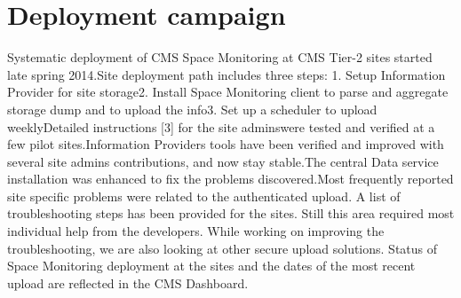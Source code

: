 \section {Deployment campaign}

Systematic deployment of CMS Space Monitoring at CMS Tier-2 sites started late spring 2014.Site deployment path includes three steps: 1. Setup Information Provider for site storage2. Install Space Monitoring client to parse and aggregate storage dump and to upload the info3. Set up a scheduler to upload weeklyDetailed instructions [3] for the site adminswere tested and verified at a few pilot sites.Information Providers tools have been verified and improved with several site admins contributions, and now stay stable.The central Data service installation was enhanced to fix the problems discovered.Most frequently reported site specific problems were related to the authenticated upload. A list of troubleshooting steps has been provided for the sites. Still this area required most individual help from the developers. While working on improving the troubleshooting, we are also looking at other secure upload solutions.
Status of Space Monitoring deployment at the sites and the dates of the most recent upload are reflected in the CMS Dashboard.